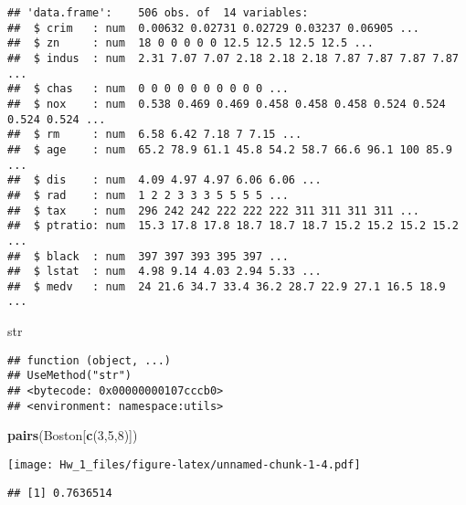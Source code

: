 \documentclass[]{article}
\newenvironment{Shaded}{\begin{snugshade}}{\end{snugshade}}
\newcommand{\DecValTok}[1]{\textcolor[rgb]{0.00,0.00,0.81}{#1}}
\newcommand{\KeywordTok}[1]{\textcolor[rgb]{0.13,0.29,0.53}{\textbf{#1}}}
\newcommand{\NormalTok}[1]{#1}
\newcommand{\OperatorTok}[1]{\textcolor[rgb]{0.81,0.36,0.00}{\textbf{#1}}}
\begin{document}
\begin{verbatim}
## 'data.frame':    506 obs. of  14 variables:
##  $ crim   : num  0.00632 0.02731 0.02729 0.03237 0.06905 ...
##  $ zn     : num  18 0 0 0 0 0 12.5 12.5 12.5 12.5 ...
##  $ indus  : num  2.31 7.07 7.07 2.18 2.18 2.18 7.87 7.87 7.87 7.87 ...
##  $ chas   : num  0 0 0 0 0 0 0 0 0 0 ...
##  $ nox    : num  0.538 0.469 0.469 0.458 0.458 0.458 0.524 0.524 0.524 0.524 ...
##  $ rm     : num  6.58 6.42 7.18 7 7.15 ...
##  $ age    : num  65.2 78.9 61.1 45.8 54.2 58.7 66.6 96.1 100 85.9 ...
##  $ dis    : num  4.09 4.97 4.97 6.06 6.06 ...
##  $ rad    : num  1 2 2 3 3 3 5 5 5 5 ...
##  $ tax    : num  296 242 242 222 222 222 311 311 311 311 ...
##  $ ptratio: num  15.3 17.8 17.8 18.7 18.7 18.7 15.2 15.2 15.2 15.2 ...
##  $ black  : num  397 397 393 395 397 ...
##  $ lstat  : num  4.98 9.14 4.03 2.94 5.33 ...
##  $ medv   : num  24 21.6 34.7 33.4 36.2 28.7 22.9 27.1 16.5 18.9 ...
\end{verbatim}

\begin{Shaded}
\begin{Highlighting}[]
\NormalTok{str}
\end{Highlighting}
\end{Shaded}

\begin{verbatim}
## function (object, ...) 
## UseMethod("str")
## <bytecode: 0x00000000107cccb0>
## <environment: namespace:utils>
\end{verbatim}

\begin{Shaded}
\begin{Highlighting}[]
\KeywordTok{pairs}\NormalTok{(Boston[}\KeywordTok{c}\NormalTok{(}\DecValTok{3}\NormalTok{,}\DecValTok{5}\NormalTok{,}\DecValTok{8}\NormalTok{)])}
\end{Highlighting}
\end{Shaded}

\texttt{[image: Hw\_1\_files/figure-latex/unnamed-chunk-1-4.pdf]}

\begin{Shaded}
\end{Shaded}

\begin{verbatim}
## [1] 0.7636514
\end{verbatim}
\end{document}
